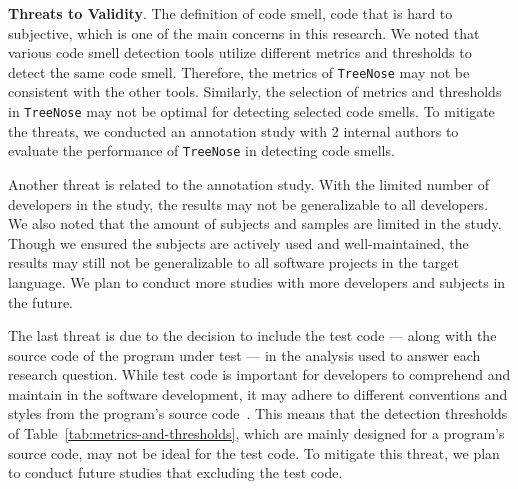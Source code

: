 {\bf Threats to Validity}. The definition of code smell, code that is hard to
subjective, which is one of the main concerns in this research.
We noted that various code smell detection tools
utilize different metrics and thresholds to detect the same code smell.
Therefore, the metrics of \texttt{TreeNose} may not be consistent with the
other tools. Similarly, the selection of metrics and thresholds in
\texttt{TreeNose} may not be optimal for detecting selected code smells. To
mitigate the threats, we conducted an annotation study with 2 internal authors to
evaluate the performance of \texttt{TreeNose} in detecting code smells.

%
Another threat is related to the annotation study. With the limited number of
developers in the study, the results may not be generalizable to all developers.
We also noted that the amount of subjects and samples are limited in the study.
Though we ensured the subjects are actively used and well-maintained, the
results may still not be generalizable to all software projects in the target
language. We plan to conduct more studies with more developers and subjects in
the future.






The last threat is due to the decision to include the test code --- along with
the source code of the program under test --- in the analysis used to answer
each research question. While test code is important for developers to
comprehend and maintain in the software development, it may adhere to different
conventions and styles from the program's source
code~\cite{Kapfhammer2004,Kapfhammer2010}. This means that the detection
thresholds of Table~\ref{tab:metrics-and-thresholds}, which are mainly designed
for a program's source code, may not be ideal for the test code. To mitigate
this threat, we plan to conduct future studies that excluding the test code.
